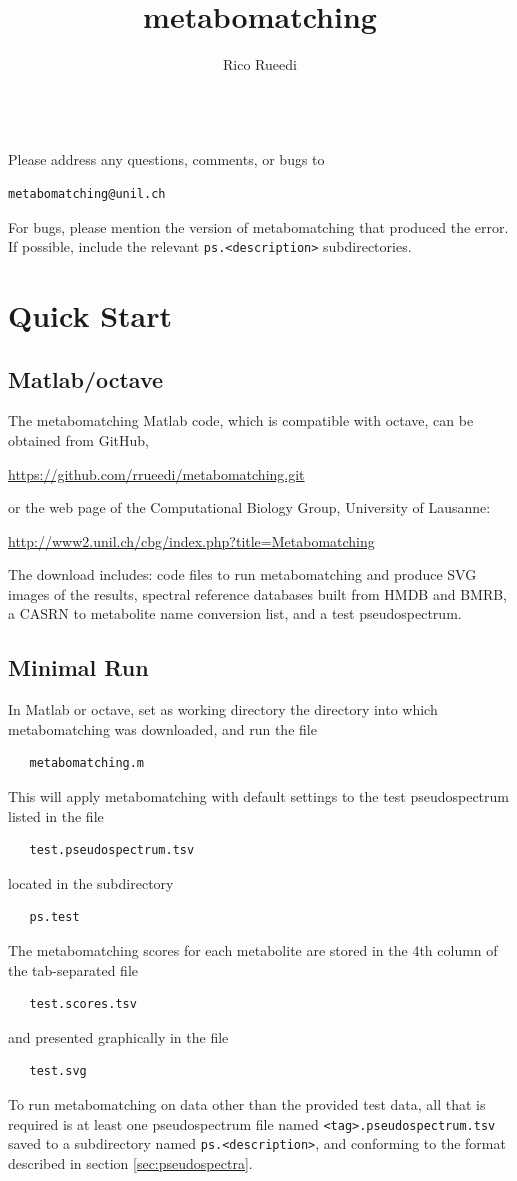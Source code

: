 \documentclass[a4paper,11pt]{article}
\author{Rico Rueedi}
\title{metabomatching}
\begin{document}
\maketitle\quad\\[16mm]
Please address any questions, comments, or bugs to
\begin{verbatim}
metabomatching@unil.ch
\end{verbatim}
For bugs, please mention the version of metabomatching that produced the error. If possible, include the relevant \verb|ps.<description>| subdirectories.
\tableofcontents
\section{Quick Start}
\subsection{Matlab/octave}
The metabomatching Matlab code, which is compatible with octave, can be obtained from GitHub,
\begin{center}\url{https://github.com/rrueedi/metabomatching.git}\end{center}
or the web page of the Computational Biology Group, University of Lausanne: \begin{center}\url{http://www2.unil.ch/cbg/index.php?title=Metabomatching}\end{center}
The download includes: code files to run metabomatching and produce SVG images of the results, spectral reference databases built from HMDB and BMRB, a CASRN to metabolite name conversion list, and a test pseudospectrum.
\subsection*{Minimal Run}
In Matlab or octave, set as working directory the directory into which metabomatching was downloaded, and run the file
\begin{verbatim}
   metabomatching.m
\end{verbatim}
This will apply metabomatching with default settings to the test pseudospectrum listed in the file
\begin{verbatim}
   test.pseudospectrum.tsv
\end{verbatim}
located in the subdirectory 
\begin{verbatim}
   ps.test
\end{verbatim}
The metabomatching scores for each metabolite are stored in the 4th column of the tab-separated file 
\begin{verbatim}
   test.scores.tsv
\end{verbatim}
and presented graphically in the file
\begin{verbatim}
   test.svg
\end{verbatim}
To run metabomatching on data other than the provided test data, all that is required is at least one pseudospectrum file named \texttt{<tag>.pseudospectrum.tsv} saved to a subdirectory named \texttt{ps.<description>}, and conforming to the format described in section \ref{sec:pseudospectra}.
\end{document}
